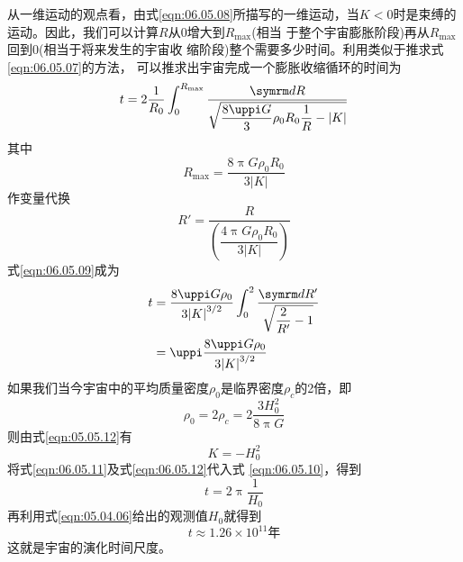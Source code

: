 从一维运动的观点看，由式\eqref{eqn:06.05.08}所描写的一维运动，当$ K
<0 $时是束缚的运动。因此，我们可以计算$ R $从0增大到$ R_{\max} $(相当
于整个宇宙膨胀阶段)再从$ R_{\max} $回到0(相当于将来发生的宇宙收
缩阶段)整个需要多少时间。利用类似于推求式\eqref{eqn:06.05.07}的方法，
可以推求出宇宙完成一个膨胀收缩循环的时间为
\begin{equation}\label{eqn:06.05.09}
    t = 2 \frac { 1 } { R _ { 0 } } \int _ 0 ^ { R _ { \max } } \frac { \dif R } { \sqrt { \dfrac { 8 \uppi G } { 3 } \rho _ { 0 } R _ { 0 } \dfrac { 1 } { R } - | K | } }
\end{equation}
其中
\begin{equation*}
    R _ { \max } = \frac { 8 \uppi G \rho _ { 0 } R _ { 0 } } { 3 | K | }
\end{equation*}
作变量代换
\begin{equation*}
    R ' = \frac { R } { \left( \dfrac { 4 \uppi G \rho _ { 0 } R _ { 0 } } { 3 | K | } \right) }
\end{equation*}
式\eqref{eqn:06.05.09}成为
\begin{equation}\label{eqn:06.05.10}
    \begin{aligned}
        t &= \frac { 8 \uppi G \rho _ { 0 } } { 3 { | K | } ^ { 3 / 2 } } \int _ { 0 } ^ { 2 } \frac { \dif R '  } { \sqrt { \dfrac { 2 } { R ' } - 1 } }  \\
            &= \uppi \frac { 8 \uppi G \rho _ { 0 } } { 3 { | K | } ^ { 3 / 2 } }
            \end{aligned}
        \end{equation}
如果我们当今宇宙中的平均质量密度$ \rho _ 0 $是临界密度$ \rho _ c $的2倍，即\vspace{-1.56em}
\begin{equation}\label{eqn:06.05.11}
    \rho _ { 0 } = 2 \rho _ { c } = 2 \frac { 3 H _ 0 ^ { 2 } } { 8 \uppi G }
\end{equation}
则由式\eqref{eqn:05.05.12}有
\begin{equation}\label{eqn:06.05.12}
    K = - H _ { 0 } ^ { 2 }
\end{equation}
将式\eqref{eqn:06.05.11}及式\eqref{eqn:06.05.12}代入式 \eqref{eqn:06.05.10}，得到
\begin{equation}\label{eqn:06.05.13}
    t = 2 \uppi \frac { 1 } { H _ { 0 } }
\end{equation}
再利用式\eqref{eqn:05.04.06}给出的观测值$ H _ { 0 } $就得到
\begin{equation*}
    t \approx 1.26 \times 10 ^ { 11 } \text{年}
\end{equation*}
这就是宇宙的演化时间尺度。